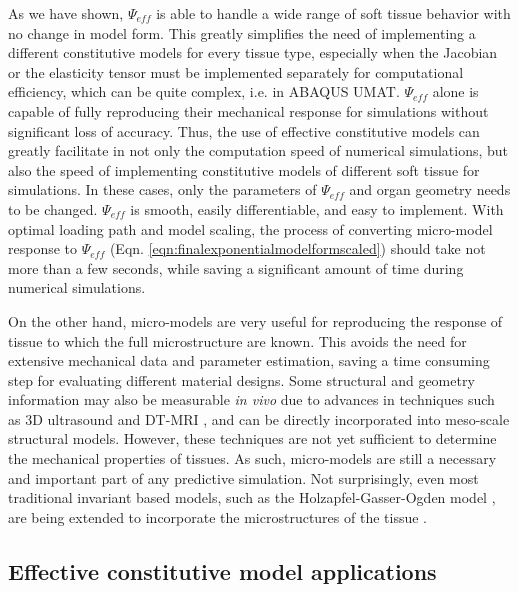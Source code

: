     
    As we have shown, $\Psi_{eff}$ is able to handle a wide range of soft tissue behavior with no change in model form. This greatly simplifies the need of implementing a different constitutive models for every tissue type, especially when the Jacobian or the elasticity tensor must be implemented separately for computational efficiency, which can be quite complex, i.e. in ABAQUS UMAT. $\Psi_{eff}$ alone is capable of fully reproducing their mechanical response for simulations without significant loss of accuracy. Thus, the use of effective constitutive models can greatly facilitate in not only the computation speed of numerical simulations, but also the speed of implementing constitutive models of different soft tissue for simulations. In these cases, only the parameters of $\Psi_{eff}$ and organ geometry needs to be changed. $\Psi_{eff}$ is smooth, easily differentiable, and easy to implement. With optimal loading path and model scaling, the process of converting micro-model response to $\Psi_{eff}$ (Eqn. \ref{eqn:finalexponentialmodelformscaled}) should take not more than a few seconds, while saving a significant amount of time during numerical simulations. 
    
    
    On the other hand, micro-models are very useful for reproducing the response of tissue to which the full microstructure are known. This avoids the need for extensive mechanical data and parameter estimation, saving a time consuming step for evaluating different material designs. Some structural and geometry information may also be measurable \textit{in vivo} due to advances in techniques such as 3D ultrasound \cite{steiner_diagnostic_1994, yang_3d_2008, fenster_3_1996} and DT-MRI \cite{basser_vivo_2000, basser_microstructural_2011}, and can be directly incorporated into meso-scale structural models. However, these techniques are not yet sufficient to determine the mechanical properties of tissues. As such, micro-models are still a necessary and important part of any predictive simulation. Not surprisingly, even most traditional invariant based models, such as the Holzapfel-Gasser-Ogden model \cite{holzapfel_new_2000}, are being extended to incorporate the microstructures of the tissue \cite{holzapfel_modelling_2015}. 
    
    

\subsection{Effective constitutive model applications}

